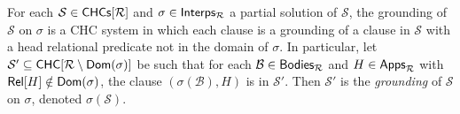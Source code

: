 For each $\mathcal{S} \in \mathsf{CHCs}[  \mathcal{R}  ]$ and $\sigma \in
\mathsf{Interps_{  \mathcal{R}  }}$ a partial solution of $\mathcal{S}$, the
grounding of $\mathcal{S}$ on $\sigma$ is a CHC system in which each
clause is a grounding of a clause in $\mathcal{S}$ with a head
relational predicate not in the domain of $\sigma$.
%
In particular, let $\mathcal{S}' \subseteq \mathsf{CHC}[  \mathcal{R} \setminus
  \mathsf{Dom}(\sigma)  ]$ be such that for each $\mathcal{B} \in \mathsf{Bodies}_{
  \mathcal{R} }$ and $H \in \mathsf{Apps}_{ \mathcal{R} }$ with $\mathsf{Rel}[ H ]
\notin \mathsf{Dom}(\sigma)$, the clause $(\sigma(\mathcal{B}), H)$ is in
$\mathcal{S}'$.
%
Then $\mathcal{S}'$ is the \emph{grounding} of $\mathcal{S}$ on
$\sigma$, denoted $\sigma(\mathcal{ S })$.

